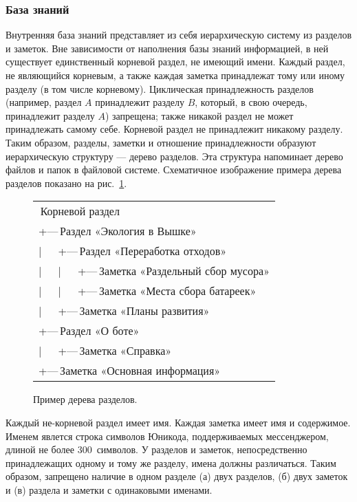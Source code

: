     \subsubsection{База знаний}
        \label{sec:req:fn:kb}
        Внутренняя база знаний представляет из себя иерархическую систему из разделов
        и заметок. Вне зависимости от наполнения базы знаний информацией, в ней существует единственный
        корневой раздел, не имеющий имени. Каждый раздел, не являющийся корневым, а также
        каждая заметка принадлежат тому или иному разделу (в том числе корневому). Циклическая
        принадлежность разделов (например, раздел \(A\) принадлежит разделу \(B\), который, в свою
        очередь, принадлежит разделу \(A\)) запрещена; также никакой раздел не может принадлежать самому
        себе. Корневой раздел не принадлежит никакому разделу. Таким образом, разделы, заметки и отношение
        принадлежности образуют иерархическую структуру --- дерево разделов. Эта структура напоминает
        дерево файлов и папок в файловой системе. Схематичное изображение примера дерева разделов
        показано на рис.~\ref{fig:req:fn:kb:tree}.
        \begin{figure}[h]
            \centering
            \begingroup
            \newcommand{\name}{\rmfamily\,}
            \begin{tabular}{>{\ttfamily}l}
                \name Корневой раздел \\
                +---\name Раздел «Экология в Вышке» \\
                |~~~+---\name Раздел «Переработка отходов» \\
                |~~~|~~~+---\name Заметка «Раздельный сбор мусора» \\
                |~~~|~~~+---\name Заметка «Места сбора батареек» \\
                |~~~+---\name Заметка «Планы развития» \\
                +---\name Раздел «О боте» \\
                |~~~+---\name Заметка «Справка» \\
                +---\name Заметка «Основная информация» \\
            \end{tabular}
            \endgroup
            \caption{Пример дерева разделов.}
            \label{fig:req:fn:kb:tree}
        \end{figure}

        Каждый не-корневой раздел имеет имя. Каждая заметка имеет имя и содержимое.
        Именем явлется строка символов Юникода, поддерживаемых мессенджером, длиной
        не более 300~символов. У разделов и заметок, непосредственно принадлежащих одному и тому же
        разделу, имена должны различаться. Таким образом, запрещено наличие в одном разделе
        (а) двух разделов, (б) двух заметок и (в) раздела и заметки с одинаковыми именами.

